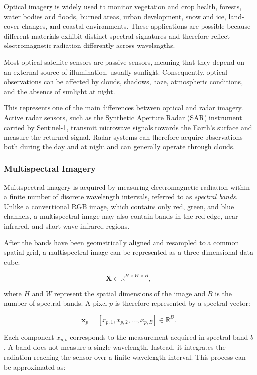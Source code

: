 \documentclass[11pt,a4paper]{article}
\begin{document}
Optical imagery is widely used to monitor vegetation and crop health,
forests, water bodies and floods, burned areas, urban development, snow
and ice, land-cover changes, and coastal environments. These applications
are possible because different materials exhibit distinct spectral
signatures and therefore reflect electromagnetic radiation differently
across wavelengths.

Most optical satellite sensors are passive sensors, meaning that they
depend on an external source of illumination, usually sunlight.
Consequently, optical observations can be affected by clouds, shadows,
haze, atmospheric conditions, and the absence of sunlight at night.

This represents one of the main differences between optical and radar
imagery. Active radar sensors, such as the Synthetic Aperture Radar
(SAR) instrument carried by Sentinel-1, transmit microwave signals
towards the Earth's surface and measure the returned signal. Radar
systems can therefore acquire observations both during the day and at
night and can generally operate through clouds.

\subsubsection{Multispectral Imagery}

Multispectral imagery is acquired by measuring electromagnetic radiation
within a finite number of discrete wavelength intervals, referred to as
\textit{spectral bands}. Unlike a conventional RGB image, which contains
only red, green, and blue channels, a multispectral image may also contain
bands in the red-edge, near-infrared, and short-wave infrared regions.

After the bands have been geometrically aligned and resampled to a common
spatial grid, a multispectral image can be represented as a three-dimensional
data cube:

\[
\mathbf{X}
\in
\mathbb{R}^{H \times W \times B},
\]

where \(H\) and \(W\) represent the spatial dimensions of the image and
\(B\) is the number of spectral bands. A pixel \(p\) is therefore
represented by a spectral vector:

\[
\mathbf{x}_p =
\left[
x_{p,1},
x_{p,2},
\ldots,
x_{p,B}
\right]
\in
\mathbb{R}^{B}.
\]

Each component \(x_{p,b}\) corresponds to the measurement acquired in
spectral band \(b\). A band does not measure a single wavelength.
Instead, it integrates the radiation reaching the sensor over a finite
wavelength interval. This process can be approximated as:
\end{document}
